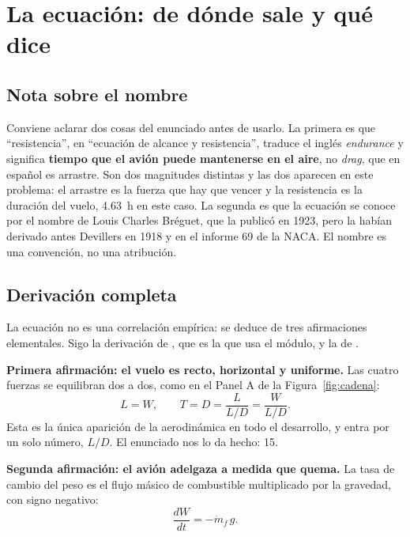\documentclass[11pt,letterpaper]{article}
\begin{document}
\section{La ecuación: de dónde sale y qué dice}

\subsection{Nota sobre el nombre}

Conviene aclarar dos cosas del enunciado antes de usarlo. La primera es que
\enquote{resistencia}, en \enquote{ecuación de alcance y resistencia},
traduce el inglés \emph{endurance} y significa \textbf{tiempo que el avión
puede mantenerse en el aire}, no \emph{drag}, que en español es arrastre. Son
dos magnitudes distintas y las dos aparecen en este problema: el arrastre es
la fuerza que hay que vencer y la resistencia es la duración del vuelo,
\SI{4.63}{\hour} en este caso. La segunda es que la ecuación se conoce por el
nombre de Louis Charles Bréguet, que la publicó en 1923, pero la habían
derivado antes Devillers en 1918 y \textcite{coffin1920} en el informe 69 de
la NACA. El nombre es una convención, no una atribución.

\subsection{Derivación completa}

La ecuación no es una correlación empírica: se deduce de tres afirmaciones
elementales. Sigo la derivación de \textcite{mitunified}, que es la que usa el
módulo, y la de \textcite{torenbeek2009}.

\textbf{Primera afirmación: el vuelo es recto, horizontal y uniforme.} Las
cuatro fuerzas se equilibran dos a dos, como en el Panel A de la
Figura~\ref{fig:cadena}:
\begin{equation}
L = W, \qquad T = D = \frac{L}{L/D} = \frac{W}{L/D}.
\label{eq:equilibrio}
\end{equation}
Esta es la única aparición de la aerodinámica en todo el desarrollo, y entra
por un solo número, \(L/D\). El enunciado nos lo da hecho: 15.

\textbf{Segunda afirmación: el avión adelgaza a medida que quema.} La tasa de
cambio del peso es el flujo másico de combustible multiplicado por la gravedad,
con signo negativo:
\begin{equation}
\frac{dW}{dt} = -\dot{m}_f\, g .
\label{eq:masa}
\end{equation}
\end{document}
